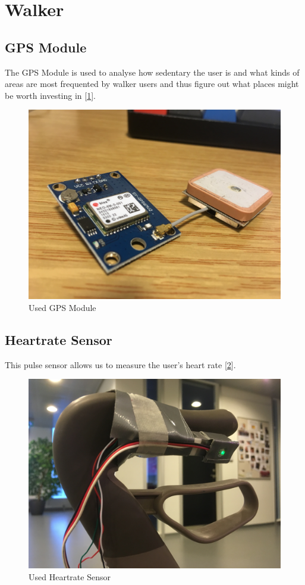 \section{Walker}

\subsection{GPS Module}
The GPS Module is used to analyse how sedentary the user is and what kinds of areas are most frequented by walker users and thus figure out what places might be worth investing in [\ref{fig:walkerpictures_gps}].
\begin{figure}[h!]
	\centering
	\includegraphics[width=0.7\linewidth]{gfx/walkerpictures/gps}
	\caption{Used GPS Module}
	\label{fig:walkerpictures_gps}
\end{figure}

\subsection{Heartrate Sensor}
This pulse sensor allows us to measure the user's heart rate [\ref{fig:walkerpictures_heartrate}].
\begin{figure}[h!]
	\centering
	\includegraphics[width=0.7\linewidth]{gfx/walkerpictures/heartrate}
	\caption{Used Heartrate Sensor}
	\label{fig:walkerpictures_heartrate}
\end{figure}

